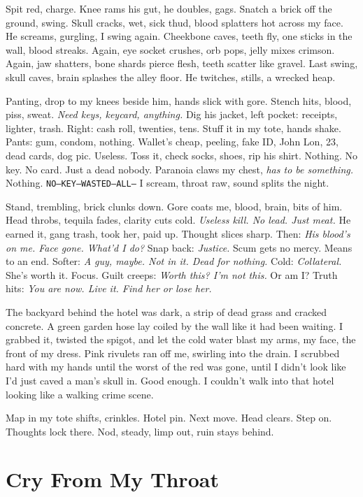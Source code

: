 \documentclass[12pt,oneside]{book}
\newcommand{\note}[1]{\texttt{#1}}
\begin{document}
Spit red, charge. Knee rams his gut, he doubles, gags. Snatch a brick off the ground, swing. Skull cracks, wet, sick thud, blood splatters hot across my face. He screams, gurgling, I swing again. Cheekbone caves, teeth fly, one sticks in the wall, blood streaks. Again, eye socket crushes, orb pops, jelly mixes crimson. Again, jaw shatters, bone shards pierce flesh, teeth scatter like gravel. Last swing, skull caves, brain splashes the alley floor. He twitches, stills, a wrecked heap.

Panting, drop to my knees beside him, hands slick with gore. Stench hits, blood, piss, sweat. \textit{Need keys, keycard, anything.} Dig his jacket, left pocket: receipts, lighter, trash. Right: cash roll, twenties, tens. Stuff it in my tote, hands shake. Pants: gum, condom, nothing. Wallet’s cheap, peeling, fake ID, \textnormal{John Lon}, 23, dead cards, dog pic. Useless. Toss it, check socks, shoes, rip his shirt. Nothing. No key. No card. Just a dead nobody. Paranoia claws my chest, \textit{has to be something.} Nothing. \note{NO—KEY—WASTED—ALL—} I scream, throat raw, sound splits the night.

Stand, trembling, brick clunks down. Gore coats me, blood, brain, bits of him. Head throbs, tequila fades, clarity cuts cold. \textit{Useless kill. No lead. Just meat.} He earned it, gang trash, took her, paid up. Thought slices sharp. Then: \textit{His blood’s on me. Face gone. What’d I do?} Snap back: \textit{Justice.} Scum gets no mercy. Means to an end. Softer: \textit{A guy, maybe. Not in it. Dead for nothing.} Cold: \textit{Collateral.} She’s worth it. Focus. Guilt creeps: \textit{Worth this? I’m not this.} Or am I? Truth hits: \textit{You are now. Live it. Find her or lose her.}

The backyard behind the hotel was dark, a strip of dead grass and cracked concrete. A green garden hose lay coiled by the wall like it had been waiting. I grabbed it, twisted the spigot, and let the cold water blast my arms, my face, the front of my dress. Pink rivulets ran off me, swirling into the drain. I scrubbed hard with my hands until the worst of the red was gone, until I didn’t look like I’d just caved a man’s skull in. Good enough. I couldn’t walk into that hotel looking like a walking crime scene.

Map in my tote shifts, crinkles. Hotel pin. Next move. Head clears. Step on. Thoughts lock there. Nod, steady, limp out, ruin stays behind.

\chapter{Cry From My Throat}
\end{document}
